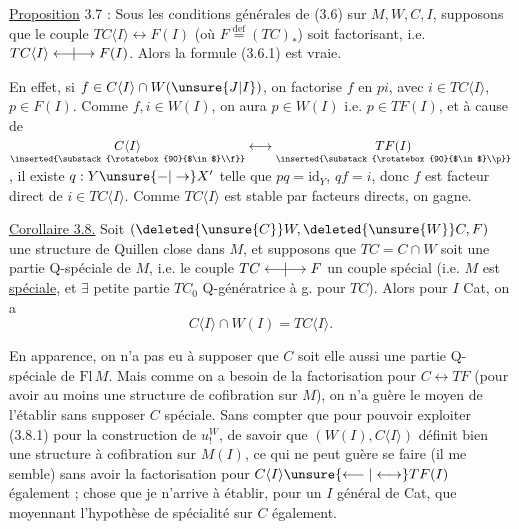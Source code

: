 \uline{Proposition} 3.7 :  Sous les conditions générales de
(3.6) sur $M,W,C,I$, supposons que le
couple $TC\langle I\rangle\longleftrightarrow F(I)$ (où $F\overset{\mathrm{def}}{=}(TC)_*$)
soit factorisant, i.e. $TC\langle I\rangle\mathrel{\longleftarrow\mkern-9mu|\mkern-9mu\longrightarrow}F(I)$.
Alors la formule (3.6.1) est vraie.

En effet, si $f\in C\langle I\rangle\cap W(\unsure{J|I})$, on factorise $f$ en $pi$, avec
$i\in TC\langle I\rangle$, $p\in F(I)$. Comme
$f,i\in W(I)$, on aura
$p\in W(I)$ i.e. $p\in TF(I)$,
et à cause de $\underset{\inserted{\substack{\rotatebox{90}{$\in$}\\f}}}{C\langle I\rangle}\longleftrightarrow
\underset{\inserted{\substack{\rotatebox{90}{$\in$}\\p}}}{TF(I)}$,
il existe $q:Y\unsure{-|\to}X'$ telle que $pq=\mathrm{id}_Y$,
$qf=i$, donc $f$ est facteur direct de
$i\in TC\langle I\rangle$. Comme $TC\langle I\rangle$ est stable
par facteurs directs, on gagne.

\uline{Corollaire 3.8.} Soit $(\deleted{\unsure{C}}W,\deleted{\unsure{W}}C,F)$ une structure de
Quillen close dans $M$, et supposons que
$TC=C\cap W$ soit une partie Q-spéciale de $M$,
i.e. le couple $TC\mathrel{\longleftarrow\mkern-9mu|\mkern-9mu\longrightarrow}F$ un couple
spécial (i.e. $M$ est \uline{spéciale}, et $\exists$ petite
partie $TC_0$ Q-génératrice à g. pour $TC$).
Alors pour  $I$  Cat, on a
\[
 C\langle I\rangle\cap W(I)=TC\langle I\rangle.\tag*{(3.8.1)}
\]

En apparence, on n'a pas eu à supposer
que $C$ soit elle aussi une partie Q-spéciale de
$\mathrm{Fl}\,M$. Mais comme on a besoin de la factorisation
pour  $C\longleftrightarrow TF$ (pour avoir au
moins une structure de cofibration sur $M$),
on n'a guère le moyen de l'établir sans
supposer $C$ spéciale. Sans compter que pour
pouvoir exploiter (3.8.1) pour la construction
de $u^{W}_{!}$,      de savoir que
$(W(I),C\langle I\rangle)$ définit bien une structure
à cofibration sur $M(I)$, ce qui ne peut guère
se faire (il me semble) sans avoir la
factorisation pour $C\langle I\rangle\unsure{\longleftarrow|\longleftrightarrow}TF(I)$
également ; chose que je n'arrive à établir,
pour un $I$ général de Cat, que moyennant
l'hypothèse de spécialité sur $C$ également.

